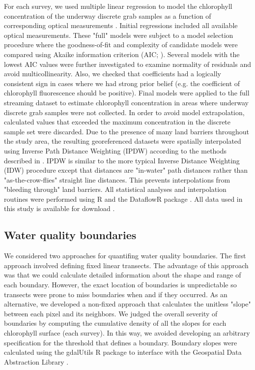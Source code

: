 For each survey, we used multiple linear regression to model the chlorophyll concentration of the underway discrete grab samples as a function of corresponding optical measurements \citep{seppala_ship_opportunity_2007,seppala_multivariate_2008}. Initial regressions included all available optical measurements. These "full" models were subject to a model selection procedure where the goodness-of-fit and complexity of candidate models were compared using Akaike information criterion (AIC; \citealp{venables2002modern}). Several models with the lowest AIC values were further investigated to examine normality of residuals and avoid multicollinearity. Also, we checked that coefficients had a logically consistent sign in cases where we had strong prior belief (e.g. the coefficient of chlorophyll fluorescence should be positive). Final models were applied to the full streaming dataset to estimate chlorophyll concentration in areas where underway discrete grab samples were not collected. In order to avoid model extrapolation, calculated values that exceeded the maximum concentration in the discrete sample set were discarded. Due to the presence of many land barriers throughout the study area, the resulting georeferenced datasets were spatially interpolated using Inverse Path Distance Weighting (IPDW) according to the methods described in \citep{stachelek_application_2015}. IPDW is similar to the more typical Inverse Distance Weighting (IDW) procedure except that distances are "in-water" path distances rather than "as-the-crow-flies" straight line distances. This prevents interpolations from "bleeding through" land barriers. All statistical analyses and interpolation routines were performed using R \citep{rcore_2015} and the DataflowR package \citep{dataflowr}. All data used in this study is available for download \citep{madden2017}.

\subsection{Water quality boundaries}
\label{boundarymethods}

We considered two approaches for quantifing water quality boundaries. The first approach involved defining fixed linear transects. The advantage of this approach was that we could calculate detailed information about the shape and range of each boundary. However, the exact location of boundaries is unpredictable so transects were prone to miss boundaries when and if they occurred. As an alternative, we developed a non-fixed approach that calculates the unitless "slope" between each pixel and its neighbors. We judged the overall severity of boundaries by computing the cumulative density of all the slopes for each chlorophyll surface (each survey). In this way, we avoided developing an arbitrary specification for the threshold that defines a boundary. Boundary slopes were calculated using the gdalUtils R package to interface with the Geospatial Data Abstraction Library \citep{gdalUtils, GDAL2017}.

